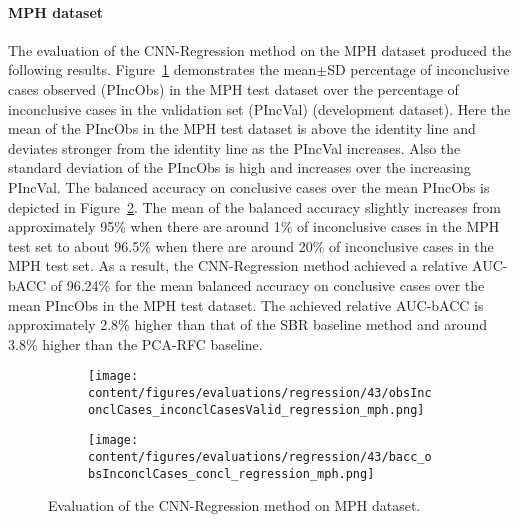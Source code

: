 
\paragraph{MPH dataset}

The evaluation of the CNN-Regression method on the MPH dataset produced the following results.
Figure~\ref{fig:obsInconclCases_inconclCasesValid_regression_mph} demonstrates
the mean$\pm$SD percentage of inconclusive cases observed (PIncObs) in the MPH test dataset 
over the percentage of inconclusive cases in the validation set (PIncVal) (development dataset).
Here the mean of the PIncObs in the MPH test dataset is above the identity line 
and deviates stronger from the identity line as the PIncVal increases.
Also the standard deviation of the PIncObs is high and increases over the increasing PIncVal.
The balanced accuracy on conclusive cases over the mean PIncObs 
is depicted in Figure~\ref{fig:bacc_obsInconclCases_concl_regression_mph}.
The mean of the balanced accuracy slightly increases from approximately 95\% 
when there are around 1\% of inconclusive cases in the MPH test set to about 96.5\% 
when there are around 20\% of inconclusive cases in the MPH test set.
As a result, the CNN-Regression method achieved a relative AUC-bACC of 96.24\% for the mean balanced accuracy on conclusive cases 
over the mean PIncObs in the MPH test dataset.
The achieved relative AUC-bACC is approximately 2.8\% higher than that of the SBR baseline method 
and around 3.8\% higher than the PCA-RFC baseline.


\begin{figure}[ht]
  \begin{subfigure}{0.49\textwidth}
    \centering
    \texttt{[image: content/figures/evaluations/regression/43/obsInconclCases\_inconclCasesValid\_regression\_mph.png]}
    \label{fig:obsInconclCases_inconclCasesValid_regression_mph}
  \end{subfigure}
  \hfill
  \begin{subfigure}{0.49\textwidth}
    \centering
    \texttt{[image: content/figures/evaluations/regression/43/bacc\_obsInconclCases\_concl\_regression\_mph.png]}
    \label{fig:bacc_obsInconclCases_concl_regression_mph}
  \end{subfigure}
  \caption{Evaluation of the CNN-Regression method on MPH dataset.}
  \label{fig:perf_regression_mph}
\end{figure}


